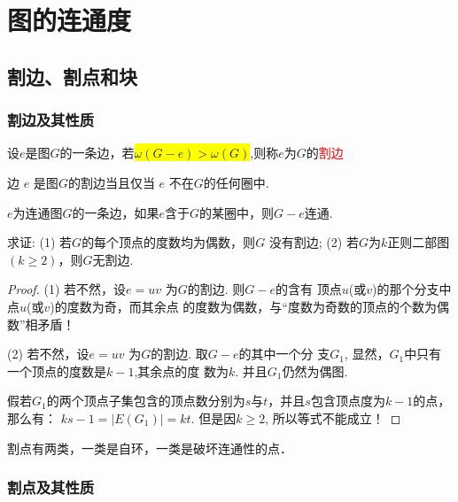 \section{图的连通度}
\subsection{割边、割点和块}

\subsubsection{割边及其性质}

\begin{definition}
	设$e$是图$G$的一条边，若\colorbox{yellow}{$\omega(G-e)>\omega(G)$},则称$e$为$G$的\textcolor{red}{割边}
\end{definition}

\begin{theorem}
	边 $e$ 是图$G$的割边当且仅当 $e$ 不在$G$的任何圈中.
\end{theorem}

\begin{corollary}
	$e$为连通图$G$的一条边，如果$e$含于$G$的某圈中，则$G-e$连通.
\end{corollary}

\begin{example}
	\label{yyhng}
	求证: (1) 若$G$的每个顶点的度数均为偶数，则$G$
	没有割边; (2) 若$G$为$k$正则二部图$(k\geq 2)$，则$G$无割边.
\end{example}
\begin{proof}
(1) 若不然，设$e=uv$ 为$G$的割边. 则$G-e$的含有
顶点$u$(或$v$)的那个分支中点$u$(或$v$)的度数为奇，而其余点
的度数为偶数，与“度数为奇数的顶点的个数为偶数”相矛盾！

(2) 若不然，设$e=uv$ 为$G$的割边. 取$G-e$的其中一个分
支$G_1$, 显然，$G_1$中只有一个顶点的度数是$k-1$,其余点的度
数为$k$. 并且$G_1$仍然为偶图.

假若$G_1$的两个顶点子集包含的顶点数分别为$s$与$t$，并且$s$包含顶点度为$k-1$的点，那么有：
$ks - 1=|E(G_1)|=kt$. 但是因$k\geq 2$, 所以等式不能成立！
\end{proof}
\begin{note}
	{ 割点有两类，一类是自环，一类是破坏连通性的点}．
\end{note}


\subsubsection{割点及其性质}

